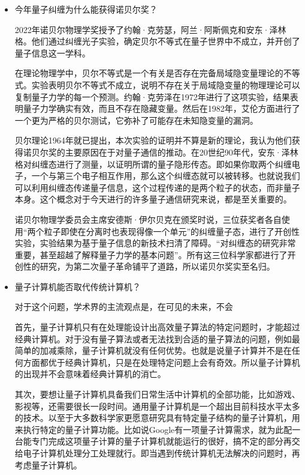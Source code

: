 \documentclass{article}
\begin{document}
\begin{itemize}
    \item 今年量子纠缠为什么能获得诺贝尔奖？\par
    2022年诺贝尔物理学奖授予了约翰·克劳瑟，阿兰·阿斯佩克和安东·泽林格。他们通过纠缠光子实验，确定贝尔不等式在量子世界中不成立，并开创了量子信息这一学科。\par
    在理论物理学中，贝尔不等式是一个有关是否存在完备局域隐变量理论的不等式。实验表明贝尔不等式不成立，说明不存在关于局域隐变量的物理理论可以复制量子力学的每一个预测。约翰·克劳泽在1972年进行了这项实验，结果表明量子力学确实有效，而且不存在隐藏变量。然后在1982年，艾伦方面进行了一个更为严格的贝尔测试，它弥补了可能存在未知隐变量的漏洞。\par
    贝尔理论1964年就已提出，本次实验的证明并不算是新的理论，我认为他们获得诺贝尔奖的主要原因在于对量子通信的推动。在20世纪90年代，安东·泽林格对纠缠态进行了测量，以证明所谓的量子隐形传态。即如果你取两个纠缠电子，一个与第三个电子相互作用，那么这个纠缠态就可以被转移。也就说我们可以利用纠缠态传递量子信息，这个过程传递的是两个粒子的状态，而非量子本身。这个概念对于今天进行的许多量子通信研究来说，都是至关重要的。\par
    诺贝尔物理学委员会主席安德斯·伊尔贝克在颁奖时说，三位获奖者各自使用“两个粒子即使在分离时也表现得像一个单元”的纠缠量子态，进行了开创性实验，实验结果为基于量子信息的新技术扫清了障碍。“对纠缠态的研究非常重要，甚至超越了解释量子力学的基本问题”。所有这三位科学家都进行了开创性的研究，为第二次量子革命铺平了道路，所以诺贝尔奖实至名归。
    \item 量子计算机能否取代传统计算机？\par
    对于这个问题，学术界的主流观点是，在可见的未来，不会\par
    首先，量子计算机只有在处理能设计出高效量子算法的特定问题时，才能超过经典计算机。对于没有量子算法或者无法找到合适的量子算法的问题，例如最简单的加减乘除，量子计算机就没有任何优势。也就是说量子计算并不是在任何方面都优于经典计算机，只是在处理特定问题上会有奇效。所以量子计算机的出现并不会意味着经典计算机的消亡。\par
    其次，要想让量子计算机具备我们日常生活中计算机的全部功能，比如游戏、影视等，还需要很长一段时间。通用量子计算机是一个超出目前科技水平太多的技术。以至于大多数科学家更愿意研究具有特定量子结构的量子计算机，用来执行特定的量子计算功能。比如说Google有一项量子计算需求，就为此配一台能专门完成这项量子计算的量子计算机就能运行的很好，搞不定的部分再交给电子计算机处理分工处理就行。即当遇到传统计算机无法解决的问题时，再考虑量子计算机。\par
    

\end{itemize}
\end{document}
